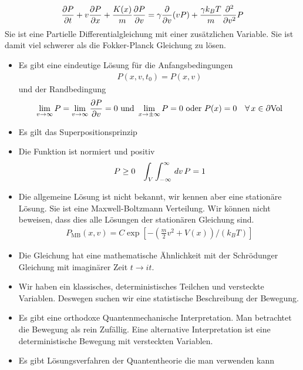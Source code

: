 %
\begin{align*}
  \frac{\partial P }{\partial t} + v \frac{\partial P }{\partial x} + \frac{K(x)}{m} \frac{\partial P }{\partial v} = \gamma \frac{\partial  }{\partial v} (v P)
  + \frac{ \gamma k_B T}{m} \frac{\partial ^2 }{\partial v^2} P
\end{align*}
%
Sie ist eine Partielle Differentialgleichung mit einer zusätzlichen Variable.
Sie ist damit viel schwerer als die Fokker-Planck Gleichung zu lösen.

\begin{itemize}
  \item Es gibt eine eindeutige Lösung für die Anfangsbedingungen
    \begin{align*}
      P(x, v, t_0) = P(x, v)
    \end{align*}
    und der Randbedingung
    \begin{align*}
      \lim_{v\to \infty} P = \lim_{v\to  \infty} \frac{\partial P }{\partial v} = 0 \text{ und }
      \lim_{ x \to \pm \infty} P = 0 \text{ oder } P(x) = 0 \quad\forall\, x \in \partial\text{Vol}
    \end{align*}
  \item Es gilt das Superpositionsprinzip
  \item Die Funktion ist normiert und positiv
    \begin{align*}
      P \ge 0 && \int_{V}^{} \int_{- \infty}^{\infty} \,dv\, P = 1
    \end{align*}
  \item Die allgemeine Lösung ist nicht bekannt, wir kennen aber eine
    stationäre Lösung. Sie ist eine Maxwell-Boltzmann Verteilung.
    Wir können nicht beweisen, dass dies alle Lösungen der stationären Gleichung
    sind.
    \begin{align*}
      P_{\text{MB}} (x,v) = C \exp\left[ - \left( \frac{m}{2} v^2 + V(x) \right)/(k_B T) \right]
    \end{align*}
  \item Die Gleichung hat eine mathematische Ähnlichkeit mit der Schrödunger Gleichung
    mit imaginärer Zeit $ t \to i t$.
  \item Wir haben ein klassisches, deterministisches Teilchen und versteckte Variablen.
    Deswegen suchen wir eine statistische Beschreibung der Bewegung.
  \item Es gibt eine orthodoxe Quantenmechanische Interpretation. Man betrachtet
    die Bewegung als rein Zufällig.
    Eine alternative Interpretation ist eine deterministische Bewegung mit
    versteckten Variablen.
  \item Es gibt Lösungsverfahren der Quantentheorie die man verwenden kann

\end{itemize}
